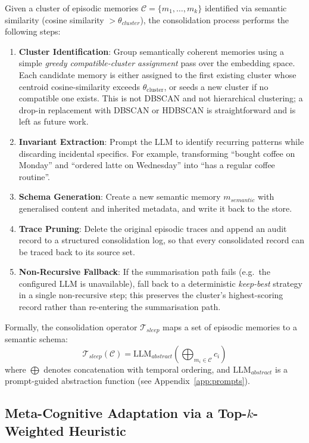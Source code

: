 Given a cluster of episodic memories $\mathcal{C} = \{m_1, \dots, m_k\}$ identified via semantic similarity (cosine similarity $> \theta_{cluster}$), the consolidation process performs the following steps:
\begin{enumerate}
    \item \textbf{Cluster Identification}: Group semantically coherent memories using a simple \emph{greedy compatible-cluster assignment} pass over the embedding space. Each candidate memory is either assigned to the first existing cluster whose centroid cosine-similarity exceeds $\theta_{\text{cluster}}$, or seeds a new cluster if no compatible one exists. This is not DBSCAN and not hierarchical clustering; a drop-in replacement with DBSCAN or HDBSCAN is straightforward and is left as future work.
    \item \textbf{Invariant Extraction}: Prompt the LLM to identify recurring patterns while discarding incidental specifics. For example, transforming ``bought coffee on Monday'' and ``ordered latte on Wednesday'' into ``has a regular coffee routine''.
    \item \textbf{Schema Generation}: Create a new semantic memory $m_{semantic}$ with generalised content and inherited metadata, and write it back to the store.
    \item \textbf{Trace Pruning}: Delete the original episodic traces and append an audit record to a structured consolidation log, so that every consolidated record can be traced back to its source set.
    \item \textbf{Non-Recursive Fallback}: If the summarisation path fails (e.g.\ the configured LLM is unavailable), fall back to a deterministic \emph{keep-best} strategy in a single non-recursive step; this preserves the cluster's highest-scoring record rather than re-entering the summarisation path.
\end{enumerate}

Formally, the consolidation operator $\mathcal{T}_{sleep}$ maps a set of episodic memories to a semantic schema:
\begin{equation}
    \mathcal{T}_{sleep}(\mathcal{C}) = \text{LLM}_{abstract}\left(\bigoplus_{m_i \in \mathcal{C}} c_i\right)
\end{equation}
where $\bigoplus$ denotes concatenation with temporal ordering, and $\text{LLM}_{abstract}$ is a prompt-guided abstraction function (see Appendix~\ref{app:prompts}).

\subsection{Meta-Cognitive Adaptation via a Top-$k$-Weighted Heuristic}
\label{subsec:meta_learning}


